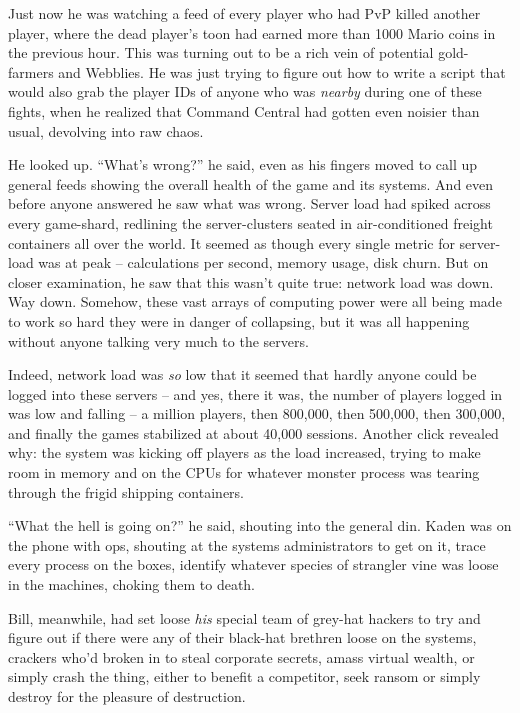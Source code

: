 Just now he was watching a feed of every player who had PvP killed
another player, where the dead player's toon had earned more than
1000 Mario coins in the previous hour. This was turning out to be a
rich vein of potential gold-farmers and Webblies. He was just
trying to figure out how to write a script that would also grab the
player IDs of anyone who was \emph{nearby} during one of these
fights, when he realized that Command Central had gotten even
noisier than usual, devolving into raw chaos.

He looked up. ``What's wrong?'' he said, even as his fingers moved to
call up general feeds showing the overall health of the game and
its systems. And even before anyone answered he saw what was wrong.
Server load had spiked across every game-shard, redlining the
server-clusters seated in air-conditioned freight containers all
over the world. It seemed as though every single metric for
server-load was at peak -- calculations per second, memory usage,
disk churn. But on closer examination, he saw that this wasn't
quite true: network load was down. Way down. Somehow, these vast
arrays of computing power were all being made to work so hard they
were in danger of collapsing, but it was all happening without
anyone talking very much to the servers.

Indeed, network load was \emph{so} low that it seemed that hardly
anyone could be logged into these servers -- and yes, there it was,
the number of players logged in was low and falling -- a million
players, then 800,000, then 500,000, then 300,000, and finally the
games stabilized at about 40,000 sessions. Another click revealed
why: the system was kicking off players as the load increased,
trying to make room in memory and on the CPUs for whatever monster
process was tearing through the frigid shipping containers.

``What the hell is going on?'' he said, shouting into the general
din. Kaden was on the phone with ops, shouting at the systems
administrators to get on it, trace every process on the boxes,
identify whatever species of strangler vine was loose in the
machines, choking them to death.

Bill, meanwhile, had set loose \emph{his} special team of grey-hat
hackers to try and figure out if there were any of their black-hat
brethren loose on the systems, crackers who'd broken in to steal
corporate secrets, amass virtual wealth, or simply crash the thing,
either to benefit a competitor, seek ransom or simply destroy for
the pleasure of destruction.

